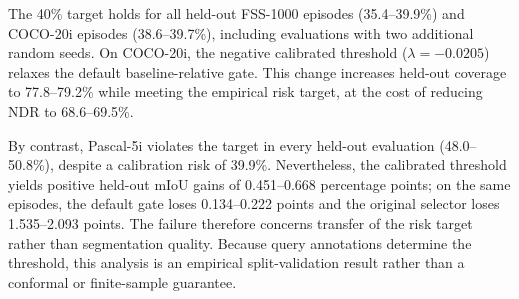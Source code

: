 \documentclass{CVM}
\begin{document}
The 40\% target holds for all held-out FSS-1000 episodes (35.4--39.9\%) and COCO-20i episodes (38.6--39.7\%), including evaluations with two additional random seeds. On COCO-20i, the negative calibrated threshold ($\lambda=-0.0205$) relaxes the default baseline-relative gate. This change increases held-out coverage to 77.8--79.2\% while meeting the empirical risk target, at the cost of reducing NDR to 68.6--69.5\%.

By contrast, Pascal-5i violates the target in every held-out evaluation (48.0--50.8\%), despite a calibration risk of 39.9\%. Nevertheless, the calibrated threshold yields positive held-out mIoU gains of 0.451--0.668 percentage points; on the same episodes, the default gate loses 0.134--0.222 points and the original selector loses 1.535--2.093 points. The failure therefore concerns transfer of the risk target rather than segmentation quality. Because query annotations determine the threshold, this analysis is an empirical split-validation result rather than a conformal or finite-sample guarantee.
\end{document}
